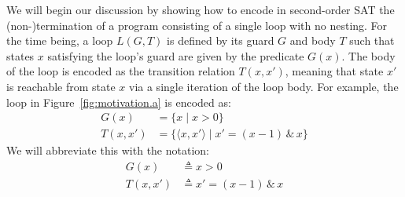 \documentclass[a4paper]{llncs}
\begin{document}
We will begin our discussion by showing how to encode in second-order SAT the
\mbox{(non-)termination} of a program consisting of a single loop with no nesting.
For the time being, a loop $L(G, T)$ is defined by its guard $G$ and body $T$
such that states $x$ satisfying the loop's guard are given by the
predicate $G(x)$.  The body of the loop is encoded as the transition
relation $T(x, x')$, meaning that state $x'$ is reachable from state $x$ via
a single iteration of the loop body.  For example, the loop in
Figure~\ref{fig:motivation.a} is encoded as:
%
\begin{align*}
G(x) & = \{ x \mid x>0 \} \\
T(x,x') &= \{ \langle x, x' \rangle \mid x' = (x - 1) \, \& \, x \}
\end{align*}
We will abbreviate this with the notation:
\begin{align*}
G(x) & \triangleq x > 0 \\
T(x, x') & \triangleq x' = (x - 1) \, \& \, x
\end{align*}
\end{document}
